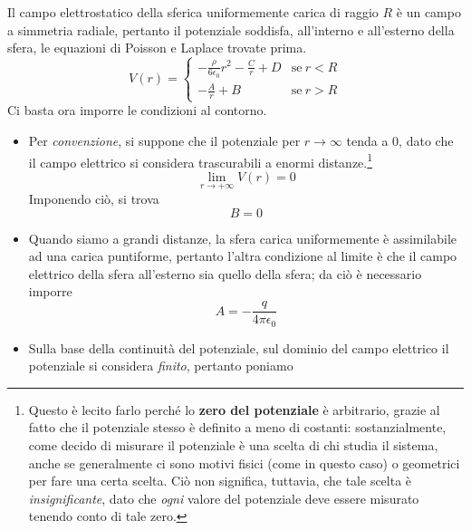 \begin{examplewt}
	Il campo elettrostatico della sferica uniformemente carica di raggio $R$ è un campo a simmetria radiale, pertanto il potenziale soddisfa, all'interno e all'esterno della sfera, le equazioni di Poisson e Laplace trovate prima.
	\begin{equation}
		V(r)=
		\begin{cases}
			-\frac{\rho}{6\epsilon_0}r^2-\frac{C}{r}+D&\text{se}\ r< R\\
			-\frac{A}{r}+B&\text{se}\ r> R
		\end{cases}
	\end{equation}
	Ci basta ora imporre le condizioni al contorno.
	\begin{itemize}
		\item Per \textit{convenzione}, si suppone che il potenziale per $r\to\infty$ tenda a $0$, dato che il campo elettrico si considera trascurabili a enormi distanze.\footnote{Questo è lecito farlo perché lo \textbf{zero del potenziale} è arbitrario, grazie al fatto che il potenziale stesso è definito a meno di costanti: sostanzialmente, come decido di misurare il potenziale è una scelta di chi studia il sistema, anche se generalmente ci sono motivi fisici (come in questo caso) o geometrici per fare una certa scelta. Ciò non significa, tuttavia, che tale scelta è \textit{insignificante}, dato che \textit{ogni} valore del potenziale deve essere misurato tenendo conto di tale zero.}
		\begin{equation*}
			\lim_{r\to+\infty}V(r)=0
		\end{equation*}
		Imponendo ciò, si trova
		\begin{equation*}
			B=0
		\end{equation*}
		\item Quando siamo a grandi distanze, la sfera carica uniformemente è assimilabile ad una carica puntiforme, pertanto l'altra condizione al limite è che il campo elettrico della sfera all'esterno sia quello della sfera; da ciò è necessario imporre 
		\begin{equation*}
			A=-\frac{q}{4\pi\epsilon_0}
		\end{equation*}
	\end{itemize}
	\begin{itemize}
		\item Sulla base della continuità del potenziale, sul dominio del campo elettrico il potenziale si considera \textit{finito}, pertanto poniamo
		\begin{equation*}

\end{equation*}
\end{itemize}
\end{examplewt}
